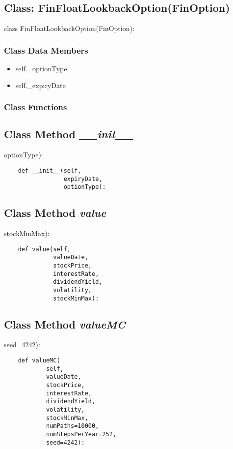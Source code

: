 \documentclass[twoside,11pt]{book}
\begin{document}
\subsection{Class: FinFloatLookbackOption(FinOption)}
class FinFloatLookbackOption(FinOption):

\subsubsection{Class Data Members}
\begin{itemize}
\item{self.\_optionType}
\item{self.\_expiryDate}
\end{itemize}

\subsubsection{Class Functions}

\subsection{Class Method {\it \_\_init\_\_}}
optionType):

\begin{lstlisting}
    def __init__(self,
                 expiryDate,
                 optionType):
\end{lstlisting}

\subsection{Class Method {\it value}}
stockMinMax):

\begin{lstlisting}
    def value(self,
              valueDate,
              stockPrice,
              interestRate,
              dividendYield,
              volatility,
              stockMinMax):
\end{lstlisting}

\subsection{Class Method {\it valueMC}}
seed=4242):

\begin{lstlisting}
    def valueMC(
            self,
            valueDate,
            stockPrice,
            interestRate,
            dividendYield,
            volatility,
            stockMinMax,
            numPaths=10000,
            numStepsPerYear=252,
            seed=4242):
\end{lstlisting}
\end{document}
